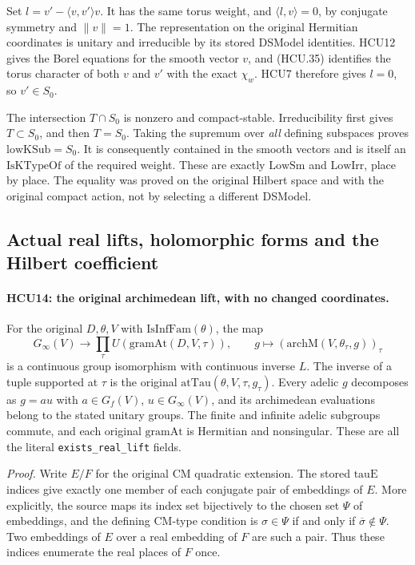 Set \(l=v'-\langle v,v'\rangle v\).
It has the same torus weight, and \(\langle l,v\rangle=0\), by
conjugate symmetry and \(\|v\|=1\).
The representation on the original Hermitian coordinates is unitary
and irreducible by its stored DSModel identities.
HCU12 gives the Borel equations for the smooth vector \(v\), and
(HCU.35) identifies the torus character of both \(v\) and \(v'\)
with the exact \(\chi_w\).
HCU7 therefore gives \(l=0\), so \(v'\in S_0\).

The intersection \(T\cap S_0\) is nonzero and compact-stable.
Irreducibility first gives \(T\subset S_0\), and then \(T=S_0\).
Taking the supremum over \emph{all} defining subspaces proves
\(\mathrm{lowKSub}=S_0\).
It is consequently contained in the smooth vectors and is itself
an \(\mathrm{IsKTypeOf}\) of the required weight.  These are exactly
\(\mathrm{LowSm}\) and \(\mathrm{LowIrr}\), place by place.
The equality was proved on the original Hilbert space and with the
original compact action, not by selecting a different DSModel.

\subsection*{Actual real lifts, holomorphic forms and the Hilbert coefficient}

\paragraph{HCU14: the original archimedean lift, with no changed coordinates.}
\label{claim:HCU14}
For the original \(D,\theta,V\) with \(\mathrm{IsInfFam}(\theta)\),
the map
\[
 G_{\infty}(V)\longrightarrow
 \prod_\tau U(\mathrm{gramAt}(D,V,\tau)),\qquad
 g\longmapsto(\mathrm{archM}(V,\theta_\tau,g))_\tau
 \tag{HCU.39}
\]
is a continuous group isomorphism with continuous inverse \(L\).
The inverse of a tuple supported at \(\tau\) is the original
\(\mathrm{atTau}(\theta,V,\tau,g_\tau)\).
Every adelic \(g\) decomposes as \(g=au\) with
\(a\in G_f(V)\), \(u\in G_\infty(V)\), and its archimedean
evaluations belong to the stated unitary groups.
The finite and infinite adelic subgroups commute, and each original
\(\mathrm{gramAt}\) is Hermitian and nonsingular.
These are all the literal \texttt{exists\_real\_lift} fields.

\emph{Proof.}
Write \(E/F\) for the original CM quadratic extension.
The stored \(\mathrm{tauE}\) indices give exactly one member of each
conjugate pair of embeddings of \(E\).  More explicitly, the source
maps its index set bijectively to the chosen set \(\Psi\) of embeddings,
and the defining CM-type condition is
\(\sigma\in\Psi\) if and only if \(\overline{\sigma}\notin\Psi\).
Two embeddings of \(E\) over a real embedding of \(F\) are such a
pair.  Thus these indices enumerate the real places of \(F\) once.


